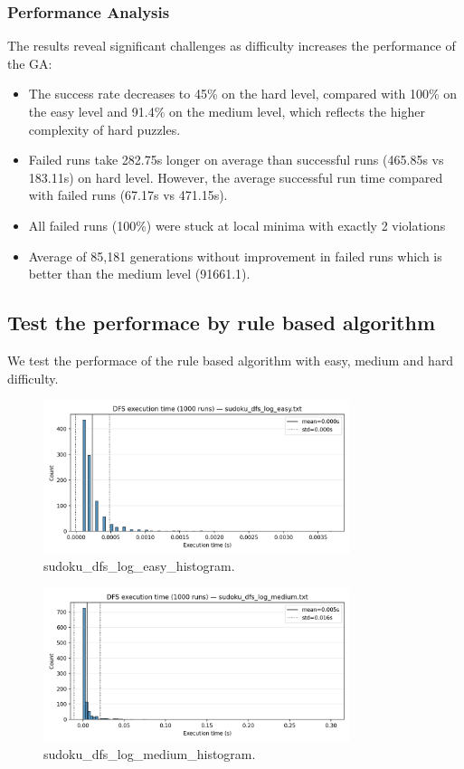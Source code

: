 \subsubsection{Performance Analysis}
The results reveal significant challenges as difficulty increases the performance of the GA:
\begin{itemize}
    \item The success rate decreases to 45\% on the hard level, compared with 100\% on the easy level and 91.4\% on the medium level, which reflects the higher complexity of hard puzzles.
    \item Failed runs take 282.75s longer on average than successful runs (465.85s vs 183.11s) on hard level. However, the average successful run time compared with failed runs (67.17s vs 471.15s).
    \item All failed runs (100\%) were stuck at local minima with exactly 2 violations
    \item Average of 85,181 generations without improvement in failed runs which is better than the medium level (91661.1).
\end{itemize}

\subsection{Test the performace by rule based algorithm}

We test the performace of the rule based algorithm with easy, medium and hard difficulty.

\begin{figure}[H]
\centering
\includegraphics[width=0.8\textwidth]{resources/sudoku_dfs_log_easy_histogram.png}
\caption{sudoku\_dfs\_log\_easy\_histogram.}
\label{fig:sudoku_dfs_log_easy_histogram}
\end{figure}

\begin{figure}[H]
\centering
\includegraphics[width=0.8\textwidth]{resources/sudoku_dfs_log_medium_histogram.png}
\caption{sudoku\_dfs\_log\_medium\_histogram.}
\label{fig:sudoku_dfs_log_medium_histogram}
\end{figure}


